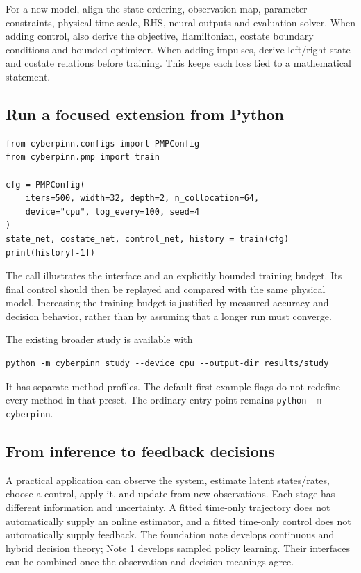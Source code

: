 \documentclass[11pt,a4paper]{article}
\theoremstyle{definition}
\theoremstyle{remark}
\begin{document}
For a new model, align the state ordering, observation map, parameter constraints, physical-time scale, RHS, neural outputs and evaluation solver. When adding control, also derive the objective, Hamiltonian, costate boundary conditions and bounded optimizer. When adding impulses, derive left/right state and costate relations before training. This keeps each loss tied to a mathematical statement.

\subsection{Run a focused extension from Python}
\begin{lstlisting}[caption={Train the bounded PMP example through its existing API}]
from cyberpinn.configs import PMPConfig
from cyberpinn.pmp import train

cfg = PMPConfig(
    iters=500, width=32, depth=2, n_collocation=64,
    device="cpu", log_every=100, seed=4
)
state_net, costate_net, control_net, history = train(cfg)
print(history[-1])
\end{lstlisting}
The call illustrates the interface and an explicitly bounded training budget. Its final control should then be replayed and compared with the same physical model. Increasing the training budget is justified by measured accuracy and decision behavior, rather than by assuming that a longer run must converge.

The existing broader study is available with
\begin{lstlisting}[language={}]
python -m cyberpinn study --device cpu --output-dir results/study
\end{lstlisting}
It has separate method profiles. The default first-example flags do not redefine every method in that preset. The ordinary entry point remains \texttt{python -m cyberpinn}.

\subsection{From inference to feedback decisions}
A practical application can observe the system, estimate latent states/rates, choose a control, apply it, and update from new observations. Each stage has different information and uncertainty. A fitted time-only trajectory does not automatically supply an online estimator, and a fitted time-only control does not automatically supply feedback. The foundation note develops continuous and hybrid decision theory; Note 1 develops sampled policy learning. Their interfaces can be combined once the observation and decision meanings agree.
\end{document}
